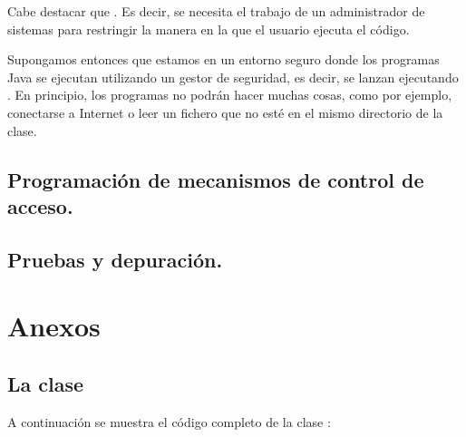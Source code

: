 \documentclass[letterpaper,10pt,spanish]{sphinxmanual}
\begin{document}
Cabe destacar que . Es decir, se necesita el trabajo de un administrador de sistemas para restringir la manera en la que el usuario ejecuta el código.

Supongamos entonces que estamos en un entorno seguro donde los programas Java se ejecutan utilizando un gestor de seguridad, es decir, se lanzan ejecutando . En principio, los programas no podrán hacer muchas cosas, como por ejemplo, conectarse a Internet o leer un fichero que no esté en el mismo directorio de la clase.


\section{Programación de mecanismos de control de acceso.}
\label{\detokenize{textos/tema5:programacion-de-mecanismos-de-control-de-acceso}}

\section{Pruebas y depuración.}
\label{\detokenize{textos/tema5:pruebas-y-depuracion}}

\chapter{Anexos}
\label{\detokenize{textos/anexos:anexos}}\label{\detokenize{textos/anexos::doc}}

\section{La clase }
\label{\detokenize{textos/anexos:la-clase-utilidadesficheros}}
A continuación se muestra el código completo de la clase :
\end{document}
